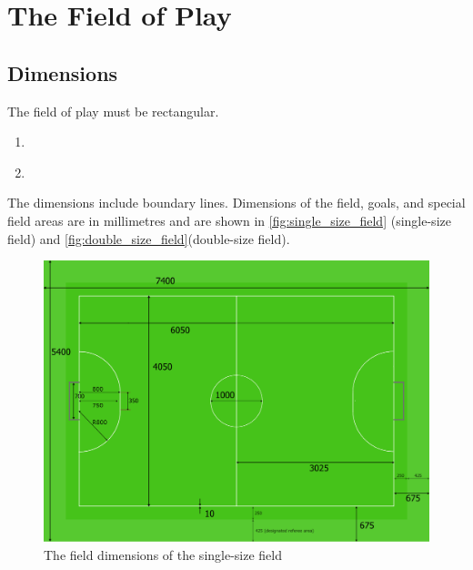 \section{The Field of Play}\label{sec:field-of-play}

\subsection{Dimensions}
The field of play must be rectangular.
\begin{enumerate}
\item \textbf{}
\item \textbf{}
\end{enumerate}
The dimensions include boundary lines.
Dimensions of the field, goals, and special field areas are in millimetres and
are shown in \autoref{fig:single_size_field} (single-size field) and
\autoref{fig:double_size_field}(double-size field).

\begin{figure}[ht] %
	\centering
	\includegraphics[width=0.8\columnwidth]{img/field_2012_drawing.png}
	\caption{The field dimensions of the single-size field}
	\label{fig:single_size_field}
\end{figure}

